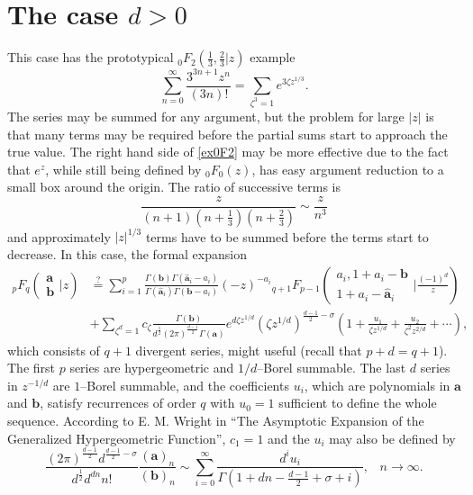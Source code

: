 \documentclass[12pt]{article}
\newcommand{\ee}[0] {e}
\numberwithin{equation}{section}
\newcommand{\FF}[6] {{}_{#1}{#2}_{#3} \left( \begin{array}{c} #4 \\ #5 \end{array} \Big| #6  \right)}
\newcommand{\FFf}[5] {{}_{#1}{#2}_{#3} \left(#4 | {#5} \right)}
\newcommand{\bfa}[0] {\mathbf{a}}
\newcommand{\bfb}[0] {\mathbf{b}}
\begin{document}
\section{The case $d>0$}
This case has the prototypical $\FFf{0}{F}{2}{\tfrac13, \tfrac23}{z}$ example
\begin{equation}
\label{ex0F2}
\sum_{n=0}^{\infty}\frac{3^{3n+1}z^n}{(3n)!} = \sum_{\zeta^3=1} \ee^{3\zeta z^{1/3}}\text{.}
\end{equation}
The series may be summed for any argument, but the problem for large $|z|$ is that many terms may be required before the partial sums start to approach the true value. The right hand side of \eqref{ex0F2} may be more effective due to the fact that $\ee^{z}$, while still being defined by ${}_0 F_0(z)$, has easy argument reduction to a small box around the origin. The ratio of successive terms is
\begin{equation*}
\frac{z}{(n+1) (n+\frac{1}{3}) (n+\frac{2}{3})} \sim \frac{z}{n^3}
\end{equation*}
and approximately $|z|^{1/3}$ terms have to be summed before the terms start to decrease. In this case, the formal expansion
\begin{equation}
\label{entirerecp}
\begin{alignedat}{1}
\FF{p}{F}{q}{\mathbf{a}}{\mathbf{b}}{z}&\overset{?}{=}\sum_{i=1}^{p} \frac{\Gamma(\mathbf{b}) \Gamma(\hat{\mathbf{a}}_i-a_i)}{\Gamma(\hat{\mathbf{a}}_i)\Gamma(\mathbf{b}-a_i)} (-z)^{-a_i} \FF{q+1}{F}{p-1}{a_i,1+a_i-\mathbf{b}}{1+a_i-\hat{\mathbf{a}}_i}{\frac{(-1)^d}{z}}\\
&+\sum_{\zeta^d=1} c_{\zeta} \frac{\Gamma(\mathbf{b})}{d^{\frac{1}{2}} (2 \pi )^{\frac{d-1}{2}} \Gamma(\mathbf{a})} \ee^{d \zeta z^{1/d}}(\zeta z^{1/d})^{\frac{d-1}{2}-\sigma} \left(1+\frac{u_1}{\zeta z^{1/d}}+\frac{u_2}{\zeta^2 z^{2/d}}+\cdots\right)\text{,}
\end{alignedat}
\end{equation}
which consists of $q+1$ divergent series, might useful (recall that $p+d=q+1$). The first $p$ series are hypergeometric and $1/d$--Borel summable. The last $d$ series in $z^{-1/d}$ are $1$--Borel summable, and the coefficients $u_i$, which are polynomials in $\mathbf{a}$ and $\mathbf{b}$, satisfy recurrences of order $q$ with $u_0=1$ sufficient to define the whole sequence. According to E. M. Wright in ``The Asymptotic Expansion of the Generalized Hypergeometric Function'', $c_{1}=1$ and the $u_i$ may also be defined by
\begin{equation*}
\frac{(2 \pi )^{\frac{d-1}{2}} d^{\frac{d-1}{2}-\sigma
   }}{d^{\frac12} d^{dn}n!}\frac{(\bfa)_n}{(\bfb)_n} \sim \sum_{i=0}^{\infty}\frac{d^i u_i}{\Gamma \left(1+d
   n-\frac{d-1}{2}+\sigma+i\right)}\text{,} \quad n \to \infty\text{.}
\end{equation*}
\end{document}
